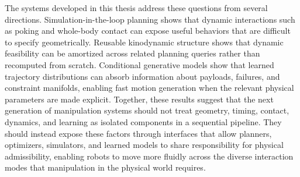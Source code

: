 The systems developed in this thesis address these questions from several directions.
Simulation-in-the-loop planning shows that dynamic interactions such as poking and whole-body contact can expose useful behaviors that are difficult to specify geometrically.
Reusable kinodynamic structure shows that dynamic feasibility can be amortized across related planning queries rather than recomputed from scratch.
Conditional generative models show that learned trajectory distributions can absorb information about payloads, failures, and constraint manifolds, enabling fast motion generation when the relevant physical parameters are made explicit.
Together, these results suggest that the next generation of manipulation systems should not treat geometry, timing, contact, dynamics, and learning as isolated components in a sequential pipeline.
They should instead expose these factors through interfaces that allow planners, optimizers, simulators, and learned models to share responsibility for physical admissibility, enabling robots to move more fluidly across the diverse interaction modes that manipulation in the physical world requires.


